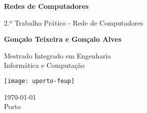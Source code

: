 \begin{titlepage}
    \begin{center}
        \vspace*{1cm}
            
        \Huge
        \textbf{Redes de Computadores}
            
        \vspace{0.5cm}
        \LARGE
        2.º Trabalho Prático - Rede de Computadores
            
        \vspace{1.5cm}
            
        \textbf{Gonçalo Teixeira e Gonçalo Alves}
            
        \vfill
            
       	Mestrado Integrado em Engenharia\\
       	Informática e Computação
            
        \vspace{0.8cm}
            
        \texttt{[image: uporto-feup]}
        
        \Large
        \today\\
        Porto
       	 
    \end{center}
\end{titlepage}